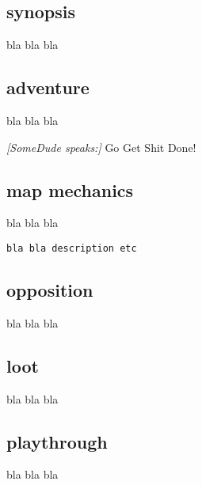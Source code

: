 \subsection*{synopsis}

bla bla bla


\subsection*{adventure}

bla bla bla

\begin{readoutloud}
\emph{[SomeDude speaks:]}
Go Get Shit Done!
\end{readoutloud}


\subsection*{map mechanics}

bla bla bla

\small \begin{verbatim}
bla bla description etc
\end{verbatim} \normalsize


\subsection*{opposition}

bla bla bla


\subsection*{loot}

bla bla bla


\subsection*{playthrough}

bla bla bla





























































